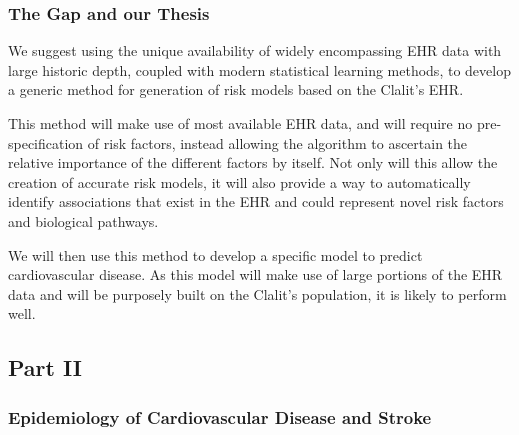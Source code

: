 \documentclass[a4paper,12pt]{article}
\begin{document}
			\subsubsection{The Gap and our Thesis}
			
			We suggest using the unique availability of widely encompassing EHR data with large historic depth, coupled with modern statistical learning methods, to develop a generic method for generation of risk models based on the Clalit's EHR.
			
			This method will make use of most available EHR data, and will require no pre-specification of risk factors, instead allowing the algorithm to ascertain the relative importance of the different factors by itself. Not only will this allow the creation of accurate risk models, it will also provide a way to automatically identify associations that exist in the EHR and could represent novel risk factors and biological pathways.
			
			We will then use this method to develop a specific model to predict cardiovascular disease. As this model will make use of large portions of the EHR data and will be purposely built on the Clalit's population, it is likely to perform well.
		
		\subsection{Part II}
		
		\subsubsection{Epidemiology of Cardiovascular Disease and Stroke}
		
\end{document}
